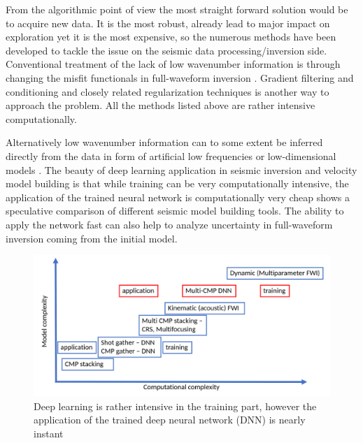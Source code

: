 \documentclass[paper,twocolomn]{geophysics}
\begin{document}

From the algorithmic point of view the most straight forward solution would be to acquire new data. It is the most robust, already lead to major impact on exploration \citep[e.g.][]{fons2013} yet it is the most expensive, so the numerous methods have been developed to tackle the issue on the seismic data processing/inversion side. %
Conventional treatment of the lack of low wavenumber information is through changing the misfit functionals in full-waveform inversion \citep[e.g.][]{luo1991wave, bozdag2011, choi2012, leeuwen2013}. 
Gradient filtering and conditioning \citep{ravaut2004multiscale, alkhalifah2015full, kazei2016, ovcharenko2018, ruan2018global} and closely related regularization techniques \citep{esserTotalvariationRegularizationStrategies2016, kazeiSaltbodyInversionMinimum2017, operto2018role, kalita2019regularized} is another way to approach the problem. All the methods listed above are rather intensive computationally.

Alternatively low wavenumber information can to some extent be inferred directly from the data in form of artificial low frequencies \citep{ovcharenkoNeuralNetworkBased2017,ovcharenkoLowFrequencyDataExtrapolation2018, ovcharenko2019deep, jin2018learn, kazei2019realistically} or low-dimensional models \citep[e.g.][]{polo2018}. The beauty of deep learning application in seismic inversion and velocity model building is that while training can be very computationally intensive, the application of the trained neural network is computationally very cheap  shows a speculative comparison of different seismic model building tools.
The ability to apply the network fast can also help to analyze uncertainty in full-waveform inversion coming from the initial model.
  
\begin{figure}
	\centering
	\includegraphics[width=0.9\linewidth]{Fig/learningParadigm}
	\caption{Deep learning is rather intensive in the training part, however the application of the trained deep neural network (DNN) is nearly instant}
	\label{fig:learningParadigm}
\end{figure}
\end{document}
